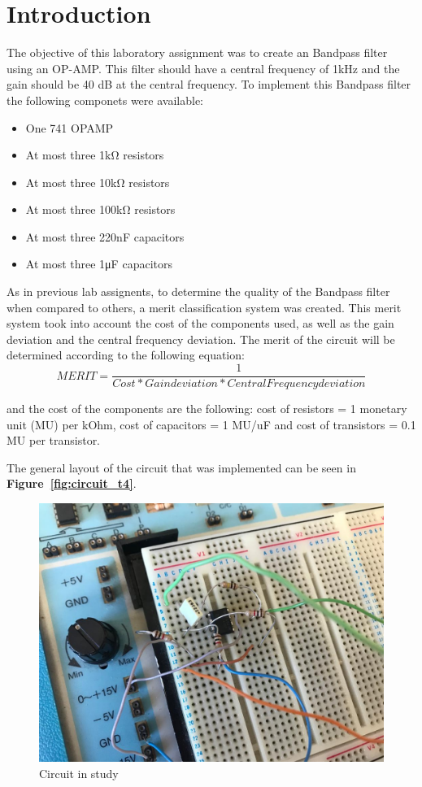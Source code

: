 \section{Introduction}
\label{sec:introduction}


\par The objective of this laboratory assignment was to create an Bandpass filter using an OP-AMP. This filter should have a central frequency of 1kHz and the gain should be 40 dB at the central frequency. To implement this Bandpass filter the following componets were available: 
\begin{itemize}

\item One 741 OPAMP
\item At most three 1kΩ resistors
\item At most three 10kΩ resistors
\item At most three 100kΩ resistors
\item At most three 220nF capacitors
\item At most three 1μF capacitors

\end{itemize} 


\par   
As in previous lab assignents, to determine the quality of the Bandpass filter when compared to others, a merit classification system was created. This merit system took into account the cost of the components used, as well as the gain deviation and the central frequency deviation. The merit of the circuit will be determined according to the following equation: 
\begin {equation}
	 MERIT = \frac{1}{Cost*Gain deviation* Central Frequency deviation}   	
	\label{eq:i1}
\end{equation}

and the cost of the components are the following: cost of resistors = 1 monetary unit (MU) per kOhm, cost of capacitors = 1 MU/uF
and cost of transistors = 0.1 MU per transistor. 

The general layout of the circuit that was implemented can be seen in \textbf{Figure~\ref{fig:circuit_t4}}.\par
\begin{figure}[h] \centering
\includegraphics[width=0.6\linewidth]{circuit_t5.jpg}
\caption{Circuit in study}
\label{fig:circuit_t5}
\end{figure}


